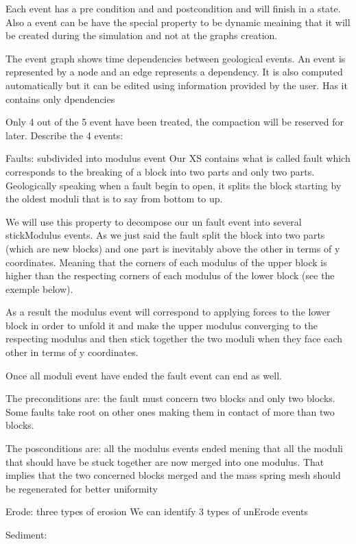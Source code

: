 \documentclass[12pt, a4paper]{memoir} %
\begin{document}
Each event has a pre condition and and postcondition and will finish in a state.
Also a event can be have the special property to be dynamic meaining that it will be created during the simulation and not at 
the graphs creation.

The event graph shows time dependencies between geological events. An event is represented by a node and an edge represents a dependency. It is also computed automatically but it can be edited using information provided by the user. Has it contains only dpendencies

Only 4 out of the 5 event have been treated, the compaction will be reserved for later.
Describe the 4 events:


Faults: subdivided into modulus event
	Our XS contains what is called fault which corresponds to the breaking of a block into two parts and only two parts. Geologically speaking when a fault begin to open, it splits the block starting by the oldest moduli that is to say from bottom to up. 
	
	We will use this property to decompose our un fault event into several stickModulus events. As we just said the fault split the block into two parts (which are new blocks) and one part is inevitably above the other in terms of y coordinates. Meaning that the corners of each modulus of the upper block is higher than the respecting corners of each modulus of the lower block (see the exemple below). 
	
	As a result the modulus event will correspond to applying forces to the lower block in order to unfold it and make the upper modulus converging to the respecting modulus and then stick together the two moduli when they face each other in terms of y coordinates.
	
	Once all moduli event have ended the fault event can end as well.
	
	The preconditions are: the fault must concern two blocks and only two blocks. Some faults take root on other ones making them in contact of more than two blocks. 
	
	The posconditions are: all the modulus events ended mening that all the moduli that should have be stuck together are now merged into one modulus. That implies that the two concerned blocks merged and the mass spring mesh should be regenerated for better uniformity 

Erode: three types of erosion
	We can identify 3 types of unErode events

Sediment:
\end{document}
